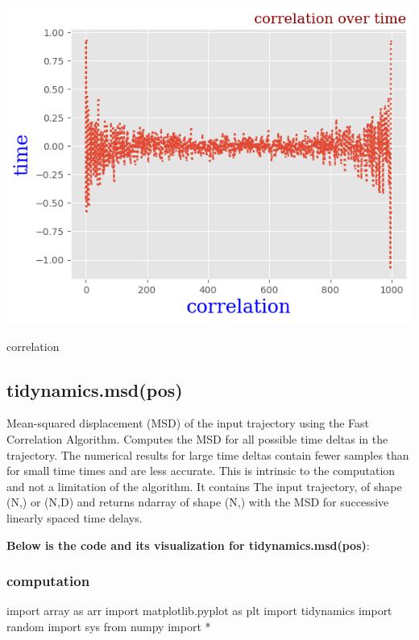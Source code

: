 \documentclass[12pt, a4paper, twoside]{report}
\begin{document}
\begin{center}
    \centering
    \includegraphics[width=1.1\textwidth , height=.6\paperheight]{figure_correlaion.png}
    \caption{correlation}
\end{center}

\newpage
\subsection{tidynamics.msd(pos)}

Mean-squared displacement (MSD) of the input trajectory using the Fast Correlation Algorithm.
Computes the MSD for all possible time deltas in the trajectory. The numerical results for large time deltas contain fewer samples than for small time times and are less accurate. This is intrinsic to the computation and not a limitation of the algorithm.\newline
It contains The input trajectory, of shape (N,) or (N,D) and returns ndarray of shape (N,) with the MSD for successive linearly spaced time delays.

\textbf{Below is the code and its visualization for tidynamics.msd(pos)}:
\subsubsection{computation}
\small

import array as arr\newline
import matplotlib.pyplot as plt\newline
import tidynamics\newline
import random\newline
import sys\newline
from numpy import *\newline
\end{document}
